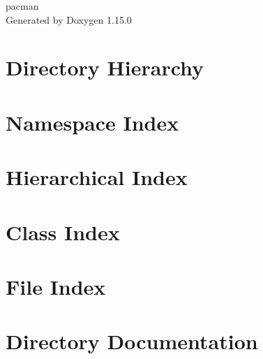 \documentclass[twoside]{book}
\newcommand{\+}{\discretionary{\mbox{\scriptsize$\hookleftarrow$}}{}{}}
\newcommand{\clearemptydoublepage}{%
    \newpage{\pagestyle{empty}\cleardoublepage}%
  }
\begin{document}
  \raggedbottom
    \hypersetup{pageanchor=false,
                bookmarksnumbered=true,
                pdfencoding=unicode
               }
  \begin{titlepage}
  \vspace*{7cm}
  \begin{center}%
  {\Large pacman}\\
  \vspace*{1cm}
  {\large Generated by Doxygen 1.15.0}\\
  \end{center}
  \end{titlepage}
  \clearemptydoublepage
  \tableofcontents
  \clearemptydoublepage
  \hypersetup{pageanchor=true}

\chapter{Directory Hierarchy}

\chapter{Namespace Index}

\chapter{Hierarchical Index}

\chapter{Class Index}

\chapter{File Index}

\chapter{Directory Documentation}













\end{document}
